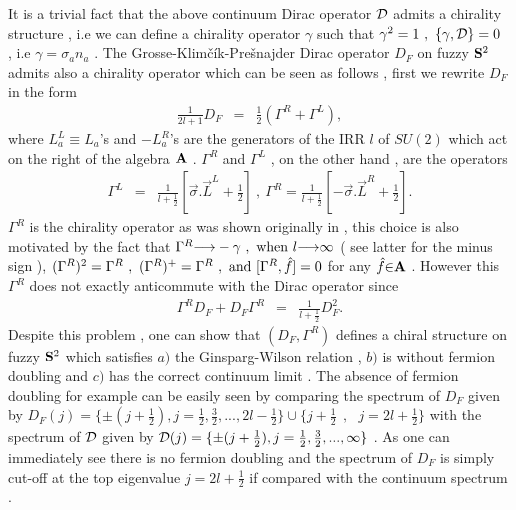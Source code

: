 \documentclass[a4paper,10pt]{article}
\begin{document}
It is a trivial fact that the above continuum Dirac operator
${\cal D}$ admits a chirality structure , i.e we can define a
chirality operator ${\gamma}$ such that $
{\gamma}^2=1~,~\{{\gamma},{\cal D}\}=0~$ , i.e
${\gamma}={\sigma}_a{n}_a$ . The
Grosse-Klim\v{c}\'{i}k-Pre\v{s}najder Dirac operator $D_F$ on
fuzzy ${\bf S}^2$ admits also a chirality operator which can be
seen as follows , first we rewrite $D_F$ in the form
\cite{trg,ydri, bal,grosse}
\begin{eqnarray}
\frac{1}{2l+1}D_{F}&=&\frac{1}{2}({\Gamma}^R+{\Gamma}^L),\label{key}
\end{eqnarray}
where $L_a^L{\equiv}L_a$'s and $-L_a^R$'s are the generators of
the IRR $l$ of $SU(2)$ which act on the right of the algebra
${\bf A}$ . ${\Gamma}^R$ and ${\Gamma}^L$ , on the other hand ,
are the operators
\begin{eqnarray}
{\Gamma}^L&=&\frac{1}{l+\frac{1}{2}}[\vec{\sigma}.\vec{L}^L+\frac{1}{2}]~,~
{\Gamma}^R=\frac{1}{l+\frac{1}{2}}[-\vec{\sigma}.\vec{L}^R+\frac{1}{2}].\label{chiralities}
\end{eqnarray}
${\Gamma}^R$ is the chirality operator as was shown originally in
\cite{watamuras} , this choice is also motivated by the fact that
${\Gamma}^R{\longrightarrow}-{\gamma}~,~{\rm
when}~l{\longrightarrow}{\infty}$ ( see latter for the minus sign
),
$({\Gamma}^R)^2={\Gamma}^{R}~,~({\Gamma}^{R})^{+}={\Gamma}^{R}~,~{\rm
and}~[{\Gamma}^R,\hat{f}]=0$ for any $\hat{f}{\in}{\bf A}$ .
However this ${\Gamma}^R$ does not exactly anticommute with the
Dirac operator since
\begin{eqnarray}
{\Gamma}^R{D}_{F}+{D}_{F}{\Gamma}^R&=&\frac{1}{l+\frac{1}{2}}{D}^2_{F}.\label{GWrelation}
\end{eqnarray}
Despite this problem , one can show that $({D}_{F},{\Gamma}^R)$
defines a chiral structure on fuzzy ${\bf S}^2$ which satisfies
$a)$ the Ginsparg-Wilson relation , $b)$ is without fermion
doubling and $c)$ has the correct continuum limit
\cite{trg,ydri}. The absence of fermion doubling for example can
be easily seen by comparing the spectrum of ${D}_{F}$ given by $
{D}_{F}(j)=\{{\pm}(j+\frac{1}{2}) ,
j=\frac{1}{2},\frac{3}{2},...,2l-\frac{1}{2}\}\cup
\{j+\frac{1}{2}~~,~~~j=2l+\frac{1}{2}\}$ with the spectrum of
${\cal D}$ given by ${\cal D}(j)=\{{\pm}(j+\frac{1}{2}) ,
j=\frac{1}{2},\frac{3}{2},...,\infty \}$ \cite{grosse} . As one
can immediately see there is no fermion doubling and the spectrum
of ${D}_F$ is simply cut-off at the top eigenvalue
$j=2l+\frac{1}{2}$ if compared with the continuum spectrum
\cite{trg,ydri}  .
\end{document}
